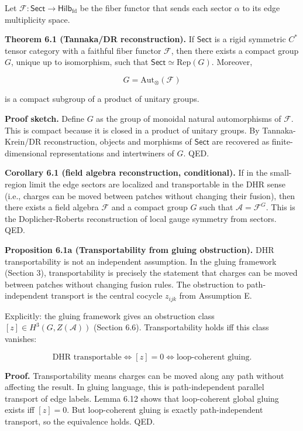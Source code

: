 \documentclass[11pt,a4paper]{article}
\theoremstyle{remark}
\begin{document}
Let \(\mathcal F: \mathsf{Sect} \to \mathsf{Hilb}_{\mathrm{fd}}\) be the fiber functor
that sends each sector \(\alpha\) to its edge multiplicity space.

\textbf{Theorem 6.1 (Tannaka/DR reconstruction).} If \(\mathsf{Sect}\) is a rigid
symmetric \(C^*\) tensor category with a faithful fiber functor \(\mathcal F\),
then there exists a compact group \(G\), unique up to isomorphism, such that
\(\mathsf{Sect} \simeq \mathrm{Rep}(G)\). Moreover,

\[
G = \mathrm{Aut}_\otimes(\mathcal F)
\]

is a compact subgroup of a product of unitary groups.

\textbf{Proof sketch.} Define \(G\) as the group of monoidal natural automorphisms
of \(\mathcal F\). This is compact because it is closed in a product of
unitary groups. By Tannaka-Krein/DR reconstruction, objects and morphisms
of \(\mathsf{Sect}\) are recovered as finite-dimensional representations and
intertwiners of \(G\). QED.

\textbf{Corollary 6.1 (field algebra reconstruction, conditional).} If in the
small-region limit the edge sectors are localized and transportable in the
DHR sense (i.e., charges can be moved between patches without changing
their fusion), then there exists a field algebra \(\mathcal F\) and a compact
group \(G\) such that \(\mathcal A = \mathcal F^G\). This is the
Doplicher-Roberts reconstruction of local gauge symmetry from sectors.
QED.

\textbf{Proposition 6.1a (Transportability from gluing obstruction).} DHR
transportability is not an independent assumption. In the gluing framework
(Section 3), transportability is precisely the statement that charges can
be moved between patches without changing fusion rules. The obstruction to
path-independent transport is the central cocycle \(z_{ijk}\) from
Assumption E.

Explicitly: the gluing framework gives an obstruction class
\([z] \in H^3(G, Z(\mathcal{A}))\) (Section 6.6). Transportability holds iff
this class vanishes:

\[
\text{DHR transportable} \iff [z] = 0 \iff \text{loop-coherent gluing}.
\]

\textbf{Proof.} Transportability means charges can be moved along any path
without affecting the result. In gluing language, this is path-independent
parallel transport of edge labels. Lemma 6.12 shows that loop-coherent
global gluing exists iff \([z] = 0\). But loop-coherent gluing is exactly
path-independent transport, so the equivalence holds. QED.
\end{document}

